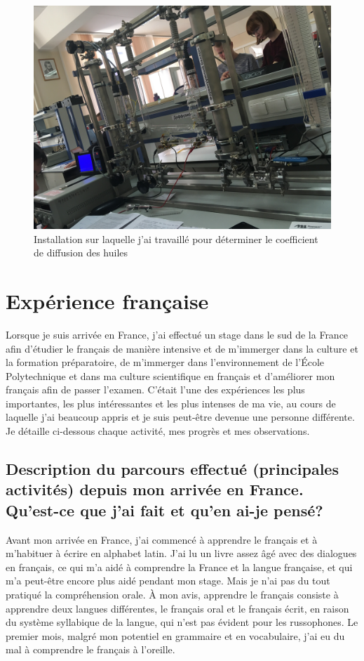 \documentclass[a4paper,12pt]{article}
\begin{document}
\begin{figure}[htbp]
\begin{minipage}{0.3\textwidth}
		\centering
		\includegraphics[width=\linewidth]{13}
		\caption{Installation sur laquelle j'ai travaillé pour déterminer le coefficient de diffusion des huiles}
		\label{fig:image3}
	\end{minipage}
	\label{fig:myfigure}
\end{figure}

\section{Expérience française}

Lorsque je suis arrivée en France, j'ai effectué un stage dans le sud de la France afin d'étudier le français de manière intensive et de m'immerger dans la culture et la formation préparatoire, de m'immerger dans l'environnement de l'École Polytechnique et dans ma culture scientifique en français et d'améliorer mon français afin de passer l'examen. C'était l'une des expériences les plus importantes, les plus intéressantes et les plus intenses de ma vie, au cours de laquelle j'ai beaucoup appris et je suis peut-être devenue une personne différente. Je détaille ci-dessous chaque activité, mes progrès et mes observations.

\subsection{Description du parcours effectué (principales activités) depuis mon arrivée en France. Qu’est-ce que j'ai fait et qu’en ai-je pensé?}

Avant mon arrivée en France, j'ai commencé à apprendre le français et à m'habituer à écrire en alphabet latin. J'ai lu un livre assez âgé avec des dialogues en français, ce qui m'a aidé à comprendre la France et la langue française, et qui m'a peut-être encore plus aidé pendant mon stage. Mais je n'ai pas du tout pratiqué la compréhension orale. À mon avis, apprendre le français consiste à apprendre deux langues différentes, le français oral et le français écrit, en raison du système syllabique de la langue, qui n'est pas évident pour les russophones. Le premier mois, malgré mon potentiel en grammaire et en vocabulaire, j'ai eu du mal à comprendre le français à l'oreille.
\end{document}
